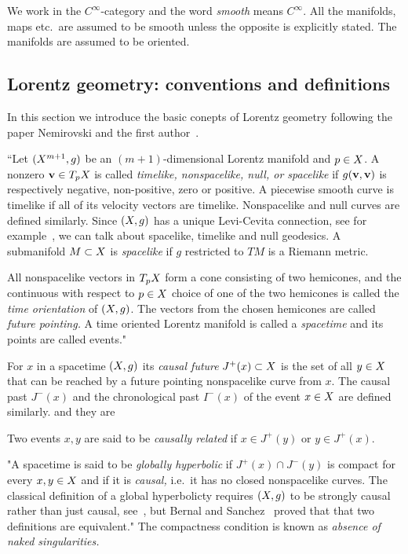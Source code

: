 \documentclass[12pt,reqno,a4paper]{amsart}
\begin{document}
\maketitle


We work in the $C^{\infty}$-category and the word {\it smooth\/} means $C^{\infty}.$ All the manifolds, maps
etc.~are assumed to be smooth unless the opposite is explicitly stated. The manifolds are assumed to be oriented.


\subsection{Lorentz geometry: conventions and definitions\/}
In this section we introduce the basic conepts of Lorentz geometry following the paper  Nemirovski and the first author~\cite{ChernovNemirovski}.

``Let $(\ss^{m+1}, g)$ be an $(m+1)$-dimensional Lorentz manifold and $p\in \ss$. A nonzero ${\bf v}\in T_p\ss$ 
is called {\it timelike, nonspacelike, null, or spacelike\/} if $g({\bf v}, {\bf v})$ is respectively 
negative, non-positive, zero or positive. A piecewise smooth curve is timelike if all of its velocity 
vectors are timelike. Nonspacelike and null curves are defined similarly. Since $(\ss, g)$ has a unique 
Levi-Cevita connection, see for example~\cite[page 22]{BeemEhrlichEasley}, we can talk about spacelike, 
timelike and null geodesics. A submanifold $M\subset \ss$ is {\it spacelike} if $g$ restricted to $TM$ is a 
Riemann metric.

All nonspacelike vectors in $T_p\ss$ form a cone consisting of two hemicones, and the continuous 
with respect to $p\in \ss$ choice of one of the two hemicones is called the {\it time orientation\/} of
$(\ss, g)$. The vectors from the chosen hemicones are called {\it future pointing.\/}
A time oriented Lorentz manifold is called a {\it spacetime\/} and its points are called events."

For $x$ in a spacetime $(\ss, g)$ its {\it causal future\/} $J^+(x)\subset \ss$ 
 is the set of all $y\in \ss$ that can be reached by a 
future pointing nonspacelike curve from $x.$ 
The causal past $J^-(x)$ and the chronological past $I^-(x)$ of the event $x\in \ss$ are defined similarly.
and they are 

Two events  $x,y$ are said to be {\it causally related\/} if $x\in J^+(y)$ or $y\in J^+(x).$

"A spacetime is said to be {\it globally hyperbolic\/} if $J^+(x)\cap J^-(y)$ is compact for every $x,y\in \ss$
and if it is {\it causal,\/} i.e.~it has no closed nonspacelike curves. The classical definition 
of a global hyperbolicty requires $(\ss,g)$ to be strongly causal rather than just causal, see~\cite{HawkingEllis}, but 
Bernal and Sanchez~\cite[Theorem 3.2]{BernalSanchezCausal} proved that that two definitions are equivalent." The compactness condition is known as {\em absence of naked singularities.}
\end{document}
